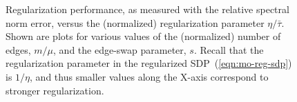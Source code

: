 \begin{figure}[h]
{  }
  \vspace{-1em}
\caption{Regularization performance, as measured with the relative 
spectral norm error, versus the (normalized) regularization parameter 
$\eta / \bar \tau$.
Shown are plots for various values of the (normalized) number of edges, 
$m/\mu$, and the edge-swap parameter, $s$.
Recall that the regularization parameter in the regularized 
SDP~(\ref{eqn:mo-reg-sdp}) is $1/\eta$, and thus smaller values along the 
X-axis correspond to stronger regularization.}
\label{fig:perf-spec}
\end{figure}



